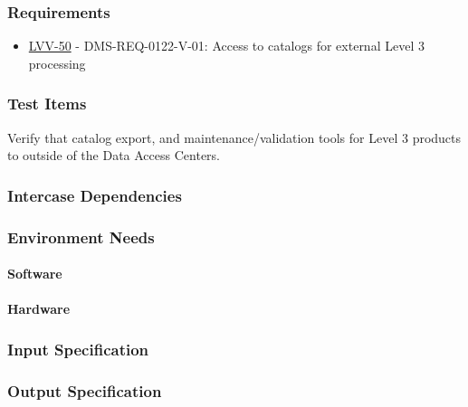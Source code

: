 \subsubsection{Requirements}
\begin{itemize}
\item \href{https://jira.lsstcorp.org/browse/LVV-50}{LVV-50} - DMS-REQ-0122-V-01: Access to catalogs for external Level 3 processing
\end{itemize}

\subsubsection{Test Items}
Verify that catalog export, and maintenance/validation tools for Level 3
products to outside of the Data Access Centers.



\subsubsection{Intercase Dependencies}

\subsubsection{Environment Needs}

\paragraph{Software}

\paragraph{Hardware}

\subsubsection{Input Specification}

\subsubsection{Output Specification}

